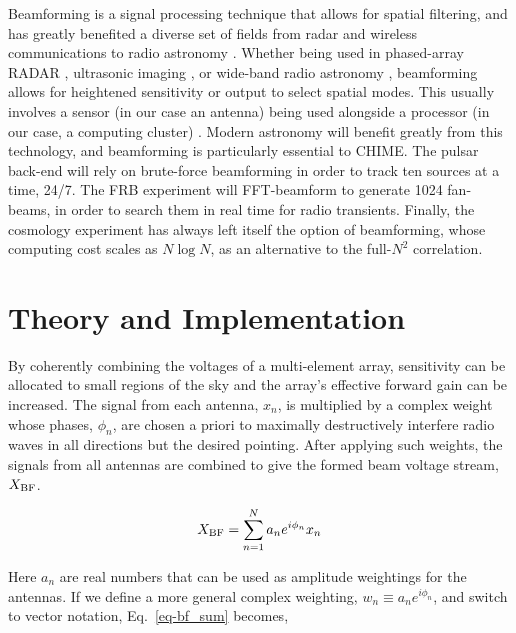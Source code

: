 Beamforming is a signal processing technique that allows for 
spatial filtering, and has greatly benefited a diverse set of fields 
from radar and wireless communications to radio astronomy 
\citep{1988IASSP...5....4V}. Whether being used in phased-array RADAR
\citep{2007BAMS...88.1753Z}, 
ultrasonic imaging \citep{macovski1983medical}, or 
wide-band radio astronomy \citep{2013PASA...30....7T}, beamforming 
allows for heightened sensitivity or output to select spatial
modes. This usually involves a sensor (in our case an antenna)
being used alongside a processor (in our case, a computing cluster) 
\citep{1988IASSP...5....4V}. Modern astronomy will benefit greatly from this
technology, and
beamforming is particularly essential to CHIME. 
The pulsar back-end will rely on
brute-force beamforming in order to track ten sources at a time, 24/7.  
The FRB experiment will FFT-beamform to generate 1024 fan-beams, 
in order to search them in real time for radio transients. Finally, the cosmology 
experiment has always left itself the option of beamforming, whose 
computing cost scales as $N\log N$, as 
an alternative to the full-$N^2$ correlation.
  
  
\section{Theory and Implementation}
\label{sec:theory}

By coherently combining the voltages of a multi-element array, 
sensitivity can be allocated to small regions of the sky and 
the array's effective forward gain can be increased. The signal 
from each antenna, $x_n$, is multiplied by a complex weight whose 
phases, $\phi_{n}$, are chosen a priori to maximally destructively interfere radio waves 
in all directions but the desired pointing. After applying 
such weights, the signals 
from all antennas are combined to give the formed beam 
voltage stream, $X_{\rm BF}$.

\begin{equation}
\label{eq-bf_sum}
X_{\rm BF} = \sum_{{n}=1}^N a_n e^{i\phi_{n}} x_n
\end{equation}

\noindent Here $a_n$ are real numbers that can be used as 
amplitude weightings for the antennas. If we define a more 
general complex weighting, $w_n \equiv a_n e^{i\phi_{n}}$, and 
switch to vector notation, Eq.~\ref{eq-bf_sum} becomes,


